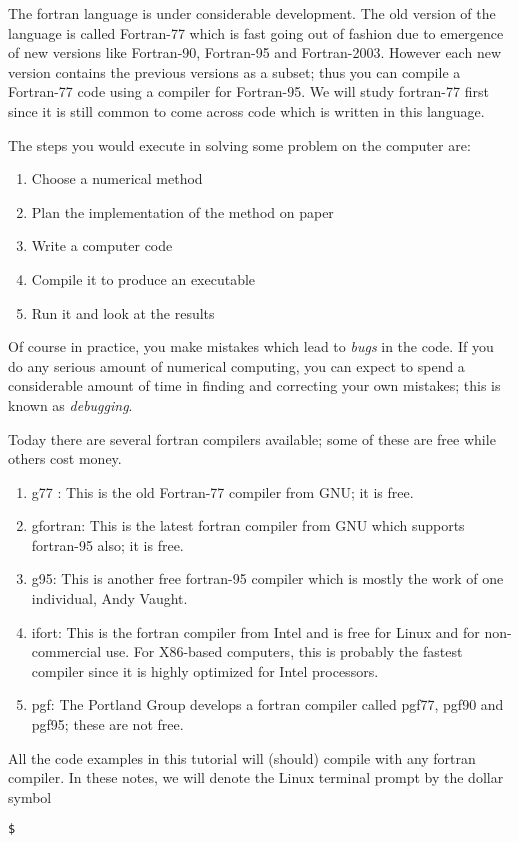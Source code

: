 \documentclass[11pt,oneside]{amsart}
\begin{document}
The fortran language is under considerable development. The old version of the language is called Fortran-77 which is fast going out of fashion due to emergence of new versions like Fortran-90, Fortran-95 and Fortran-2003. However each new version contains the previous versions as a subset; thus you can compile a Fortran-77 code using a compiler for Fortran-95. We will study fortran-77 first since it is still common to come across code which is written in this language.

The steps you would execute in solving some problem on the computer are:

\begin{enumerate}
\item Choose a numerical method
\item Plan the implementation of the method on paper
\item Write a computer code
\item Compile it to produce an executable
\item Run it and look at the results
\end{enumerate}

Of course in practice, you make mistakes which lead to {\em bugs} in the code. If you do any serious amount of numerical computing, you can expect to spend a considerable amount of time in finding and correcting your own mistakes; this is known as {\em debugging}.

Today there are several fortran compilers available; some of these are free while others cost money.

\begin{enumerate}
\item g77 : This is the old Fortran-77 compiler from GNU; it is free.
\item gfortran: This is the latest fortran compiler from GNU which supports fortran-95 also; it is free.
\item g95: This is another free fortran-95 compiler which is mostly the work of one individual, Andy Vaught.
\item ifort: This is the fortran compiler from Intel and is free for Linux and for non-commercial use. For X86-based computers, this is probably the fastest compiler since it is highly optimized for Intel processors.
\item pgf: The Portland Group develops a fortran compiler called pgf77, pgf90 and pgf95; these are not free.
\end{enumerate}

All the code examples in this tutorial will (should) compile with any fortran compiler.  In these notes, we will denote the Linux terminal prompt by the dollar symbol
\begin{verbatim}
$
\end{verbatim}
\end{document}

